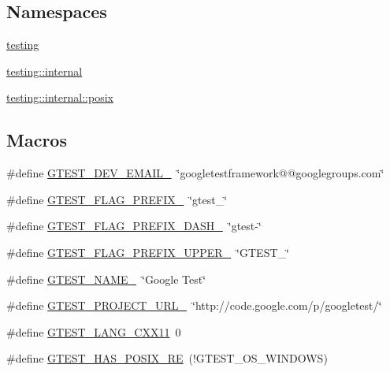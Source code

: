 \subsection*{Namespaces}
\begin{DoxyCompactItemize}
\item 
\hyperlink{namespacetesting}{testing}
\item 
\hyperlink{namespacetesting_1_1internal}{testing\-::internal}
\item 
\hyperlink{namespacetesting_1_1internal_1_1posix}{testing\-::internal\-::posix}
\end{DoxyCompactItemize}
\subsection*{Macros}
\begin{DoxyCompactItemize}
\item 
\#define \hyperlink{gtest-port_8h_a21086d276b1a64d6763ee8a94b12c1b8}{G\-T\-E\-S\-T\-\_\-\-D\-E\-V\-\_\-\-E\-M\-A\-I\-L\-\_\-}~\char`\"{}googletestframework@@googlegroups.\-com\char`\"{}
\item 
\#define \hyperlink{gtest-port_8h_a088e84784c589ba9b1fc48602ad8eabf}{G\-T\-E\-S\-T\-\_\-\-F\-L\-A\-G\-\_\-\-P\-R\-E\-F\-I\-X\-\_\-}~\char`\"{}gtest\-\_\-\char`\"{}
\item 
\#define \hyperlink{gtest-port_8h_a4251ff898f9f94ec6b8b9402c3436759}{G\-T\-E\-S\-T\-\_\-\-F\-L\-A\-G\-\_\-\-P\-R\-E\-F\-I\-X\-\_\-\-D\-A\-S\-H\-\_\-}~\char`\"{}gtest-\/\char`\"{}
\item 
\#define \hyperlink{gtest-port_8h_a4018b7f288f974d022df397e2730633a}{G\-T\-E\-S\-T\-\_\-\-F\-L\-A\-G\-\_\-\-P\-R\-E\-F\-I\-X\-\_\-\-U\-P\-P\-E\-R\-\_\-}~\char`\"{}G\-T\-E\-S\-T\-\_\-\char`\"{}
\item 
\#define \hyperlink{gtest-port_8h_a13d98c217176bd8722c395b9225fc19d}{G\-T\-E\-S\-T\-\_\-\-N\-A\-M\-E\-\_\-}~\char`\"{}Google Test\char`\"{}
\item 
\#define \hyperlink{gtest-port_8h_a5aa3c938fc1d049f1d9c5332f6a0b1d4}{G\-T\-E\-S\-T\-\_\-\-P\-R\-O\-J\-E\-C\-T\-\_\-\-U\-R\-L\-\_\-}~\char`\"{}http\-://code.\-google.\-com/p/googletest/\char`\"{}
\item 
\#define \hyperlink{gtest-port_8h_a6e310924e9ce4a9f8fda1b189cc680c4}{G\-T\-E\-S\-T\-\_\-\-L\-A\-N\-G\-\_\-\-C\-X\-X11}~0
\item 
\#define \hyperlink{gtest-port_8h_af5c4295ea1d76f07f65934f659792431}{G\-T\-E\-S\-T\-\_\-\-H\-A\-S\-\_\-\-P\-O\-S\-I\-X\-\_\-\-R\-E}~(!G\-T\-E\-S\-T\-\_\-\-O\-S\-\_\-\-W\-I\-N\-D\-O\-W\-S)

\end{DoxyCompactItemize}

